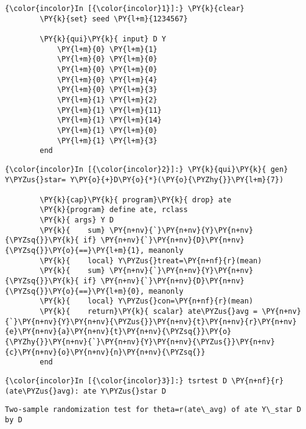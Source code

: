 \documentclass[11pt,notitlepage]{article}\usepackage[]{graphicx}\usepackage[]{color}
\makeatletter
\newenvironment{kframe}{%
 \def\at@end@of@kframe{}%
 \ifinner\ifhmode%
  \def\at@end@of@kframe{\end{minipage}}%
  \begin{minipage}{\columnwidth}%
 \fi\fi%
 \def\FrameCommand##1{\hskip\@totalleftmargin \hskip-\fboxsep
 \colorbox{shadecolor}{##1}\hskip-\fboxsep
     \hskip-\linewidth \hskip-\@totalleftmargin \hskip\columnwidth}%
 \MakeFramed {\advance\hsize-\width
   \@totalleftmargin\z@ \linewidth\hsize
   \@setminipage}}%
 {\par\unskip\endMakeFramed%
 \at@end@of@kframe}
\newenvironment{knitrout}{}{} %
\makeatother
\begin{document}
\begin{knitrout}
\color{fgcolor}\begin{kframe}
    \begin{Verbatim}[commandchars=\\\{\}]
{\color{incolor}In [{\color{incolor}1}]:} \PY{k}{clear}
        \PY{k}{set} seed \PY{l+m}{1234567}
        
        \PY{k}{qui}\PY{k}{ input} D Y 
        	\PY{l+m}{0} \PY{l+m}{1}
        	\PY{l+m}{0} \PY{l+m}{0}
        	\PY{l+m}{0} \PY{l+m}{0}
        	\PY{l+m}{0} \PY{l+m}{4}
        	\PY{l+m}{0} \PY{l+m}{3}
        	\PY{l+m}{1} \PY{l+m}{2}
        	\PY{l+m}{1} \PY{l+m}{11}
        	\PY{l+m}{1} \PY{l+m}{14}
        	\PY{l+m}{1} \PY{l+m}{0}
        	\PY{l+m}{1} \PY{l+m}{3}
        end
\end{Verbatim}

    \begin{Verbatim}[commandchars=\\\{\}]
{\color{incolor}In [{\color{incolor}2}]:} \PY{k}{qui}\PY{k}{ gen} Y\PYZus{}star= Y\PY{o}{+}D\PY{o}{*}(\PY{o}{\PYZhy{}}\PY{l+m}{7})
        
        \PY{k}{cap}\PY{k}{ program}\PY{k}{ drop} ate
        \PY{k}{program} define ate, rclass
        \PY{k}{	args} Y D
        \PY{k}{    sum} \PY{n+nv}{`}\PY{n+nv}{Y}\PY{n+nv}{\PYZsq{}}\PY{k}{ if} \PY{n+nv}{`}\PY{n+nv}{D}\PY{n+nv}{\PYZsq{}}\PY{o}{==}\PY{l+m}{1}, meanonly
        \PY{k}{    local} Y\PYZus{}treat=\PY{n+nf}{r}(mean)
        \PY{k}{    sum} \PY{n+nv}{`}\PY{n+nv}{Y}\PY{n+nv}{\PYZsq{}}\PY{k}{ if} \PY{n+nv}{`}\PY{n+nv}{D}\PY{n+nv}{\PYZsq{}}\PY{o}{==}\PY{l+m}{0}, meanonly
        \PY{k}{    local} Y\PYZus{}con=\PY{n+nf}{r}(mean)
        \PY{k}{    return}\PY{k}{ scalar} ate\PYZus{}avg = \PY{n+nv}{`}\PY{n+nv}{Y}\PY{n+nv}{\PYZus{}}\PY{n+nv}{t}\PY{n+nv}{r}\PY{n+nv}{e}\PY{n+nv}{a}\PY{n+nv}{t}\PY{n+nv}{\PYZsq{}}\PY{o}{\PYZhy{}}\PY{n+nv}{`}\PY{n+nv}{Y}\PY{n+nv}{\PYZus{}}\PY{n+nv}{c}\PY{n+nv}{o}\PY{n+nv}{n}\PY{n+nv}{\PYZsq{}}
        end
\end{Verbatim}

    \begin{Verbatim}[commandchars=\\\{\}]
{\color{incolor}In [{\color{incolor}3}]:} tsrtest D \PY{n+nf}{r}(ate\PYZus{}avg): ate Y\PYZus{}star D
\end{Verbatim}

    \begin{Verbatim}[commandchars=\\\{\}]
Two-sample randomization test for theta=r(ate\_avg) of ate Y\_star D by D


\end{Verbatim}
\end{kframe}
\end{knitrout}
\end{document}

